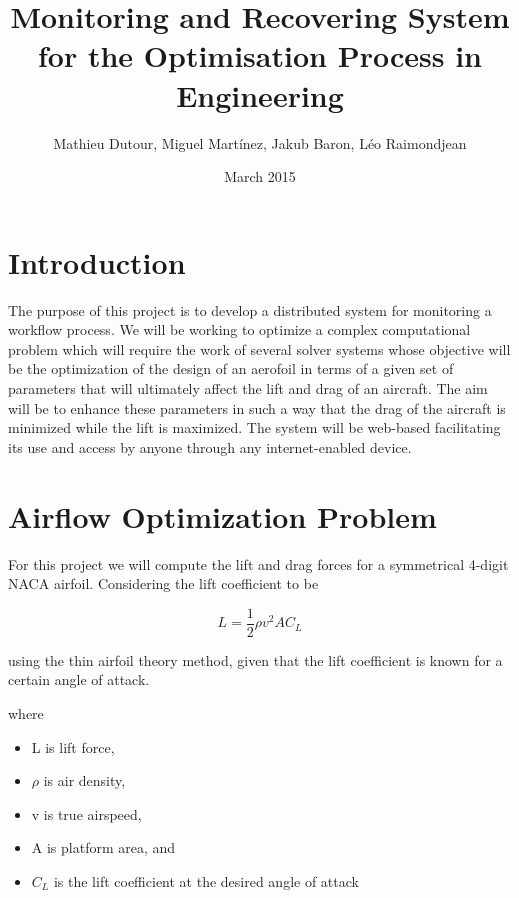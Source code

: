 \documentclass{article}
\title{Monitoring and Recovering System for the Optimisation Process in Engineering}
\author{Mathieu Dutour, Miguel Martínez, Jakub Baron, Léo Raimondjean}
\date{March 2015}
\begin{document}
\maketitle

\tableofcontents

\section{Introduction}
The purpose of this project is to develop a distributed system for monitoring a workflow process. We will be working to optimize a complex computational problem which will require the work of several solver systems whose objective will be the optimization of the design of an aerofoil in terms of a given set of parameters that will ultimately affect the lift and drag of an aircraft. The aim will be to enhance these parameters in such a way that the drag of the aircraft is minimized while the lift is maximized. The system will be web-based facilitating its use and access by anyone through any internet-enabled device.


\section{Airflow Optimization Problem}

For this project we will compute the lift and drag forces for a symmetrical 4-digit NACA airfoil. Considering the lift coefficient to be

\begin{equation}
L = \frac{1}{2}\rho v^2 A C_L
\end{equation}

using the thin airfoil theory method, given that the lift coefficient is known for a certain angle of attack.

where

\begin{itemize}
  \item L is lift force,
  \item $\rho$ is air density,
  \item v is true airspeed,
  \item A is platform area, and
  \item $C_L$ is the lift coefficient at the desired angle of attack
\end{itemize}
\end{document}
